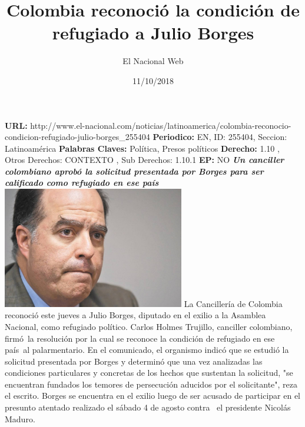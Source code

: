 \documentclass{article}%
\title{\textbf{Colombia reconoció la condición de refugiado a Julio Borges}}%
\author{El Nacional Web}%
\date{11/10/2018}%
\begin{document}
%
\normalsize%
\maketitle%
\textbf{URL: }%
http://www.el{-}nacional.com/noticias/latinoamerica/colombia{-}reconocio{-}condicion{-}refugiado{-}julio{-}borges\_255404\newline%
%
\textbf{Periodico: }%
EN, %
ID: %
255404, %
Seccion: %
Latinoamérica\newline%
%
\textbf{Palabras Claves: }%
Política, Presos políticos\newline%
%
\textbf{Derecho: }%
1.10%
, Otros Derechos: %
CONTEXTO%
, Sub Derechos: %
1.10.1%
\newline%
%
\textbf{EP: }%
NO\newline%
\newline%
%
\textbf{\textit{Un canciller colombiano aprobó la solicitud presentada por Borges para ser calificado como refugiado en ese país}}%
\newline%
\newline%
%
\includegraphics[width=300px]{199.jpg}%
\newline%
%
La Cancillería de Colombia reconoció este jueves a Julio Borges, diputado en el exilio a la Asamblea Nacional, como refugiado político.%
\newline%
%
Carlos Holmes Trujillo, canciller colombiano, firmó~la resolución por la cual se reconoce la condición de refugiado en ese país~al palarmentario.%
\newline%
%
En el comunicado, el organismo indicó que se estudió la solicitud presentada por Borges y determinó que una vez analizadas las condiciones particulares y concretas de los hechos que sustentan la solicitud, "se encuentran fundados los temores de persecución aducidos por el solicitante", reza el escrito.%
\newline%
%
Borges se encuentra en el exilio luego de ser acusado de participar en el presunto atentado realizado el sábado 4 de agosto contra~ el presidente Nicolás Maduro.%
\newline%
%
\end{document}
